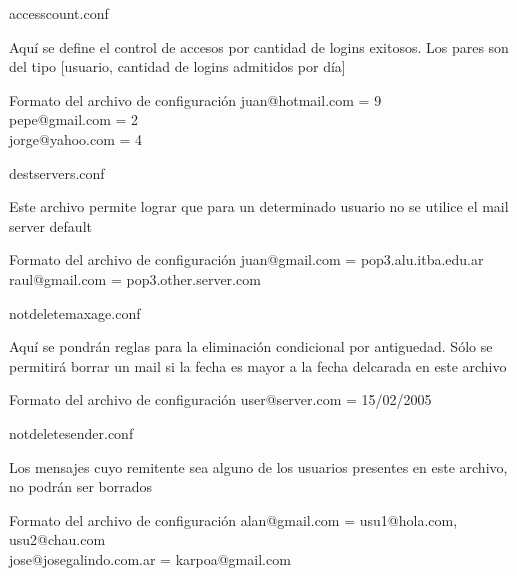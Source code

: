 \documentclass{beamer}
\begin{document}
\begin{frame}{access\textunderscore count.conf}

\par Aquí se define el control de accesos por cantidad de logins exitosos. Los pares son del tipo [usuario, cantidad de logins admitidos por día]\\[0.5cm]

\begin{block}{Formato del archivo de configuración}
juan@hotmail.com = 9\\
pepe@gmail.com = 2\\
jorge@yahoo.com = 4\\
\end{block}

\end{frame}

\begin{frame}{dest\textunderscore servers.conf}

\par Este archivo permite lograr que para un determinado usuario no se utilice el mail server default\\[0.5cm]

\begin{block}{Formato del archivo de configuración}
juan@gmail.com = pop3.alu.itba.edu.ar\\
raul@gmail.com = pop3.other.server.com\\
\end{block}

\end{frame}

\begin{frame}{notdelete\textunderscore maxage.conf}

\par Aquí se pondrán reglas para la eliminación condicional por antiguedad. Sólo se permitirá borrar un mail si la fecha es mayor a la fecha delcarada en este archivo\\[0.5cm]

\begin{block}{Formato del archivo de configuración}
user@server.com = 15/02/2005\\
\end{block}

\end{frame}

\begin{frame}{notdelete\textunderscore sender.conf}

\par Los mensajes cuyo remitente sea alguno de los usuarios presentes en este archivo, no podrán ser borrados\\[0.5cm]

\begin{block}{Formato del archivo de configuración}
alan@gmail.com = usu1@hola.com, usu2@chau.com\\
jose@josegalindo.com.ar = karpoa@gmail.com\\
\end{block}

\end{frame}
\end{document}
